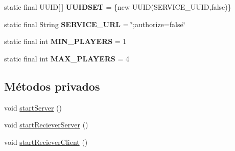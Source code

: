 \begin{DoxyCompactItemize}
\item 
\hypertarget{classBatallaEspacial_1_1Broadcaster_aee2bbe25013335d0d276c4a14f8b2197}{
static final UUID\mbox{[}$\,$\mbox{]} {\bfseries UUIDSET} = \{new UUID(SERVICE\_\-UUID,false)\}}
\label{classBatallaEspacial_1_1Broadcaster_aee2bbe25013335d0d276c4a14f8b2197}

\item 
\hypertarget{classBatallaEspacial_1_1Broadcaster_a7b2929c761447e3b6baa63bc938843e6}{
static final String {\bfseries SERVICE\_\-URL} = \char`\"{};authorize=false\char`\"{}}
\label{classBatallaEspacial_1_1Broadcaster_a7b2929c761447e3b6baa63bc938843e6}

\item 
\hypertarget{classBatallaEspacial_1_1Broadcaster_a5bb56484d9c0b3844577004ece27874c}{
static final int {\bfseries MIN\_\-PLAYERS} = 1}
\label{classBatallaEspacial_1_1Broadcaster_a5bb56484d9c0b3844577004ece27874c}

\item 
\hypertarget{classBatallaEspacial_1_1Broadcaster_a495f0b2bcfa16f3fb09e34c0ffd4cefa}{
static final int {\bfseries MAX\_\-PLAYERS} = 4}
\label{classBatallaEspacial_1_1Broadcaster_a495f0b2bcfa16f3fb09e34c0ffd4cefa}

\end{DoxyCompactItemize}
\subsection*{Métodos privados}
\begin{DoxyCompactItemize}
\item 
void \hyperlink{classBatallaEspacial_1_1Broadcaster_a2bae6d97069109f933ae5bd9ef1f11f6}{startServer} ()
\item 
void \hyperlink{classBatallaEspacial_1_1Broadcaster_a2742f0b1d35b9397865a917303c379ed}{startRecieverServer} ()
\item 
void \hyperlink{classBatallaEspacial_1_1Broadcaster_abb252cfa330aa39e29213f676017e0de}{startRecieverClient} ()
\end{DoxyCompactItemize}
